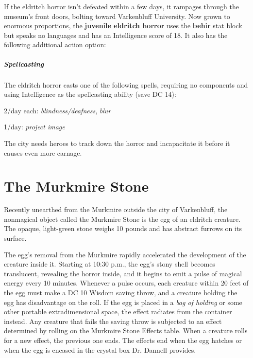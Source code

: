 \documentclass[10pt,a4paper,twoside,bg=print,twocolumn,openany,nodeprecatedcode]{dndbook}
\begin{document}
If the eldritch horror isn't defeated within a few days, it rampages through the museum's front doors, bolting toward Varkenbluff University. Now grown to enormous proportions, the \textbf{juvenile eldritch horror} uses the \textbf{behir} stat block but speaks no languages and has an Intelligence score of 18. It also has the following additional action option:

\begin{DndReadAloud}{}
\subparagraph{Spellcasting}
The eldritch horror casts one of the following spells, requiring no components and using Intelligence as the spellcasting ability (save DC 14):

2/day each: \textit{blindness/deafness}, \textit{blur}

1/day: \textit{project image}

\end{DndReadAloud}

The city needs heroes to track down the horror and incapacitate it before it causes even more carnage.

\section{The Murkmire Stone}
Recently unearthed from the Murkmire outside the city of Varkenbluff, the nonmagical object called the Murkmire Stone is the egg of an eldritch creature. The opaque, light-green stone weighs 10 pounds and has abstract furrows on its surface.

The egg's removal from the Murkmire rapidly accelerated the development of the creature inside it. Starting at 10:30 p.m., the egg's stony shell becomes translucent, revealing the horror inside, and it begins to emit a pulse of magical energy every 10 minutes. Whenever a pulse occurs, each creature within 20 feet of the egg must make a DC 10 Wisdom saving throw, and a creature holding the egg has disadvantage on the roll. If the egg is placed in a \textit{bag of holding} or some other portable extradimensional space, the effect radiates from the container instead. Any creature that fails the saving throw is subjected to an effect determined by rolling on the Murkmire Stone Effects table. When a creature rolls for a new effect, the previous one ends. The effects end when the egg hatches or when the egg is encased in the crystal box Dr. Dannell provides.
\end{document}
